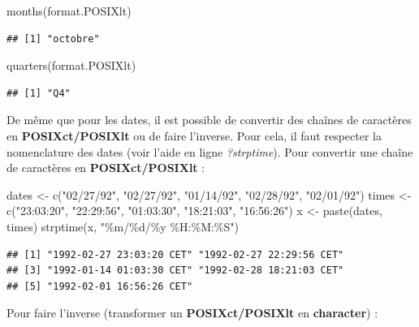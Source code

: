 \documentclass[
]{book}
\newenvironment{Shaded}{\begin{snugshade}}{\end{snugshade}}
\newcommand{\FunctionTok}[1]{\textcolor[rgb]{0.00,0.00,0.00}{#1}}
\newcommand{\NormalTok}[1]{#1}
\newcommand{\OtherTok}[1]{\textcolor[rgb]{0.56,0.35,0.01}{#1}}
\newcommand{\StringTok}[1]{\textcolor[rgb]{0.31,0.60,0.02}{#1}}
\theoremstyle{definition}
\theoremstyle{definition}
\theoremstyle{definition}
\theoremstyle{definition}
\theoremstyle{remark}
\begin{document}
\begin{Shaded}
\begin{Highlighting}[]
\FunctionTok{months}\NormalTok{(format.POSIXlt)}
\end{Highlighting}
\end{Shaded}

\begin{verbatim}
## [1] "octobre"
\end{verbatim}

\begin{Shaded}
\begin{Highlighting}[]
\FunctionTok{quarters}\NormalTok{(format.POSIXlt)}
\end{Highlighting}
\end{Shaded}

\begin{verbatim}
## [1] "Q4"
\end{verbatim}

De même que pour les dates, il est possible de convertir des chaînes de caractères en \textbf{POSIXct/POSIXlt} ou de faire l'inverse. Pour cela, il faut respecter la nomenclature des dates (voir l'aide en ligne \emph{?strptime}). Pour convertir une chaîne de caractères en \textbf{POSIXct/POSIXlt} :

\begin{Shaded}
\begin{Highlighting}[]
\NormalTok{dates }\OtherTok{\textless{}{-}} \FunctionTok{c}\NormalTok{(}\StringTok{"02/27/92"}\NormalTok{, }\StringTok{"02/27/92"}\NormalTok{, }\StringTok{"01/14/92"}\NormalTok{, }\StringTok{"02/28/92"}\NormalTok{, }\StringTok{"02/01/92"}\NormalTok{)}
\NormalTok{times }\OtherTok{\textless{}{-}} \FunctionTok{c}\NormalTok{(}\StringTok{"23:03:20"}\NormalTok{, }\StringTok{"22:29:56"}\NormalTok{, }\StringTok{"01:03:30"}\NormalTok{, }\StringTok{"18:21:03"}\NormalTok{, }\StringTok{"16:56:26"}\NormalTok{)}
\NormalTok{x }\OtherTok{\textless{}{-}} \FunctionTok{paste}\NormalTok{(dates, times)}
\FunctionTok{strptime}\NormalTok{(x, }\StringTok{"\%m/\%d/\%y \%H:\%M:\%S"}\NormalTok{)}
\end{Highlighting}
\end{Shaded}

\begin{verbatim}
## [1] "1992-02-27 23:03:20 CET" "1992-02-27 22:29:56 CET"
## [3] "1992-01-14 01:03:30 CET" "1992-02-28 18:21:03 CET"
## [5] "1992-02-01 16:56:26 CET"
\end{verbatim}

Pour faire l'inverse (transformer un \textbf{POSIXct/POSIXlt} en \textbf{character}) :
\end{document}

